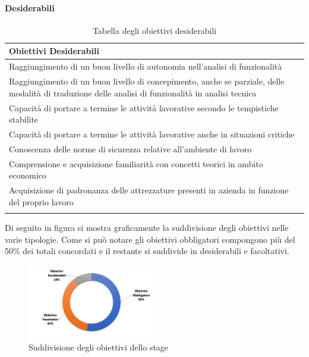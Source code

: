 	\paragraph{Desiderabili}		

		\begin{center}
		  \bgroup
		  \def\arraystretch{1.4}
		   \setlength\arrayrulewidth{0.6pt}
		   \begin{longtable}{ | p{11cm} |} \hline
		   
		    \cellcolor[gray]{0.9} \textbf{Obiettivi Desiderabili} \\ \hline

			Raggiungimento di un buon livello di autonomia nell'analisi di funzionalità \\ \hline
			Raggiungimento di un buon livello di concepimento, anche se parziale, delle modalità di traduzione delle analisi di funzionalità in analisi tecnica \\ \hline
			Capacità di portare a termine le attività lavorative secondo le tempistiche stabilite \\ \hline
			Capacità di portare a termine le attività lavorative anche in situazioni critiche \\ \hline
			Conoscenza delle norme di sicurezza relative all'ambiente di lavoro \\ \hline
			Comprensione e acquisizione familiarità con concetti teorici in ambito economico \\ \hline
			Acquisizione di padronanza delle attrezzature presenti in azienda in funzione del proprio lavoro \\ \hline
			\caption{Tabella degli obiettivi desiderabili}
		    \end{longtable}
		  \egroup
		\end{center}

	Di seguito in figura si mostra graficamente la suddivisione degli obiettivi nelle varie tipologie. Come si può notare gli obiettivi obbligatori compongono più del 50\% dei totali concordati e il restante si suddivide in desiderabili e facoltativi.\\
	
	\begin{figure}[H]
		\centering
	   	\includegraphics[width=0.5\textwidth]{immagini/Percentuale_Obiettivi}
	   	\caption{Suddivisione degli obiettivi dello stage}
	\end{figure}


